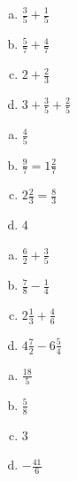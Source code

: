 \begin{tehtavasivu}
        \begin{tehtava}
            \begin{enumerate}[a)]
        	\item $\frac{3}{5} + \frac{1}{5}$
        	\item $\frac{5}{7} + \frac{4}{7}$
        	\item $2 + \frac{2}{3}$
        	\item$3 + \frac{3}{5} + \frac{2}{5}$   
            \end{enumerate}
            \begin{vastaus}
        		\begin{enumerate}[(a)]
        			\item $\frac{4}{5}$
        			\item $\frac{9}{7} = 1 \frac{2}{7}$
        			\item $2 \frac{2}{3} = \frac{8}{3}$
        			\item $4$
        		\end{enumerate}
            \end{vastaus}
        \end{tehtava}
        
        \begin{tehtava}
        
        \begin{enumerate}[a)]
        	\item $\frac{6}{2} + \frac{3}{5}$
        	\item $\frac{7}{8} - \frac{1}{4}$
        	\item $2 \frac{1}{3} + \frac{4}{6}$
        	\item $4 \frac{7}{2} - 6 \frac{5}{4}$
        \end{enumerate}
            \begin{vastaus}		
        		\begin{enumerate}[a)]
        			\item $\frac{18}{5}$
        			\item $\frac{5}{8}$
        			\item $3$
        			\item $-\frac{41}{6}$ 
        		\end{enumerate}
            \end{vastaus}
        \end{tehtava}
        
        \begin{tehtava}
        

\end{tehtava}
\end{tehtavasivu}
